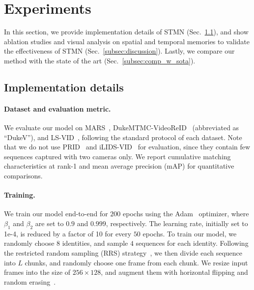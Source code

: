 \documentclass[10pt,twocolumn,letterpaper]{article}
\begin{document}
\vspace{-0.2cm}
\section{Experiments}
\vspace{-0.1cm}
	In this section, we provide implementation details of STMN (Sec.~\ref{subsec:implement}), and show ablation studies and visual analysis on spatial and temporal memories to validate the effectiveness of STMN (Sec.~\ref{subsec:discussion}). Lastly, we compare our method with the state of the art (Sec.~\ref{subsec:comp_w_sota}).

	\vspace{-0.1cm}
	\subsection{Implementation details}  \label{subsec:implement}
	
		\vspace{-0.2cm}
		\paragraph{Dataset and evaluation metric.}
		
			We evaluate our model on MARS~\cite{zheng2016mars}, DukeMTMC-VideoReID~\cite{ristani2016performance,wu2018exploit} (abbreviated as ``DukeV''), and LS-VID~\cite{li2019global}, following the standard protocol of each dataset. Note that we do not use PRID~\cite{hirzer2011person} and iLIDS-VID~\cite{wang2014person} for evaluation, since they contain few sequences captured with two cameras only. We report cumulative matching characteristics at rank-1 and mean average precision (mAP) for quantitative comparisons. 
		
		\vspace{-0.4cm}
		\paragraph{Training.}
		
			We train our model end-to-end for $200$ epochs using the Adam~\cite{kingma2014adam} optimizer, where $\beta_1$ and $\beta_2$ are set to $0.9$ and $0.999$, respectively. The learning rate, initially set to 1e-4, is reduced by a factor of 10 for every $50$ epochs. To train our model, we randomly choose $8$ identities, and sample $4$ sequences for each identity. Following the restricted random sampling (RRS) strategy~\cite{li2018diversity}, we then divide each sequence into $L$ chunks, and randomly choose one frame from each chunk. We resize input frames into the size of $256 \times 128$, and augment them with horizontal flipping and random erasing~\cite{zhong2017random}.
		
\end{document}
